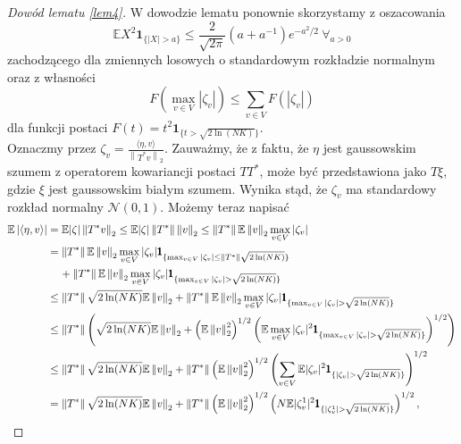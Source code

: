 \documentclass[man,mfiu]{mgrwms}
\newcommand{\norm}[1]{\left\lVert#1\right\rVert}
\begin{document}
\begin{proof}[Dowód lematu \ref{lem4}]
W dowodzie lematu ponownie skorzystamy z oszacowania 
\begin{displaymath}
\mathbb{E}X^2\pmb{1}_{\{|X|>a\}}\leq \frac{2}{\sqrt{2\pi}}(a+a^{-1})e^{-a^2/2}\ \forall_{a>0}
\end{displaymath}
zachodzącego dla zmiennych losowych o standardowym rozkładzie normalnym oraz z własności
\begin{displaymath}
F(\max_{v\in V}|\zeta_v|)\leq \sum_{v\in V}F(|\zeta_v|)
\end{displaymath}
dla funkcji postaci $F(t)=t^2\pmb{1}_{\{t> \sqrt{2\ln (NK)}\}}$.\\
Oznaczmy przez $\zeta_v=\frac{\langle \eta ,v\rangle}{\norm{T^*v}_2}$. Zauważmy, że z faktu, że $\eta$ jest gaussowskim  szumem  z operatorem kowariancji postaci $TT^*$, może być przedstawiona jako $T\xi$, gdzie $\xi$ jest gaussowskim białym szumem. Wynika stąd, że $\zeta_v$ ma standardowy rozkład normalny $\mathcal{N}(0,1)$. Możemy teraz napisać
\begin{displaymath}
\begin{split}
\mathbb{E}\left|\langle \eta , v\rangle\right|&=\mathbb{E}|\zeta |\norm{T^*v}_2\leq\mathbb{E}|\zeta |\norm{T^*}\norm{v}_2\leq \norm{T^*} \mathbb{E}\norm{v}_2\max_{v\in V}|\zeta_v|\\
&=\norm{T^*}\mathbb{E}\norm{v}_2\max_{v\in V}|\zeta_v|\pmb{1}_{\{\max_{v\in V}|\zeta_v|\leq \norm{T^*}\sqrt{2\ln (NK)}\}}\\
&\hspace{4mm}+\norm{T^*}\mathbb{E}\norm{v}_2\max_{v\in V}|\zeta_v|\pmb{1}_{\{\max_{v\in V}|\zeta_v|> \sqrt{2\ln (NK)}\}}\\
&\leq \norm{T^*}\sqrt{2\ln (NK)}\mathbb{E}\norm{v}_2+\norm{T^*}\mathbb{E}\norm{v}_2\max_{v\in V}|\zeta_v|\pmb{1}_{\{\max_{v\in V}|\zeta_v|> \sqrt{2\ln (NK)}\}}\\
&\leq \norm{T^*}\left(\sqrt{2\ln (NK)}\mathbb{E}\norm{v}_2+\left(\mathbb{E}\norm{v}_2^2\right)^{1/2}\left(\mathbb{E}\max_{v\in V}|\zeta_v|^2\pmb{1}_{\{\max_{v\in V}|\zeta_v|> \sqrt{2\ln (NK)}\}}\right)^{1/2}\right)\\
&\leq \norm{T^*}\sqrt{2\ln (NK)}\mathbb{E}\norm{v}_2+\norm{T^*}\left(\mathbb{E}\norm{v}_2^2\right)^{1/2}\left(\sum_{v\in V}\mathbb{E}|\zeta_v|^2\pmb{1}_{\{|\zeta_v|> \sqrt{2\ln (NK)}\}}\right)^{1/2}\\
&=\norm{T^*}\sqrt{2\ln (NK)}\mathbb{E}\norm{v}_2+\norm{T^*}\left(\mathbb{E}\norm{v}_2^2\right)^{1/2}\left(N\mathbb{E}|\zeta_v^1|^2\pmb{1}_{\{|\zeta_v^1|> \sqrt{2\ln (NK)}\}}\right)^{1/2},

\end{split}
\end{displaymath}
\end{proof}
\end{document}
